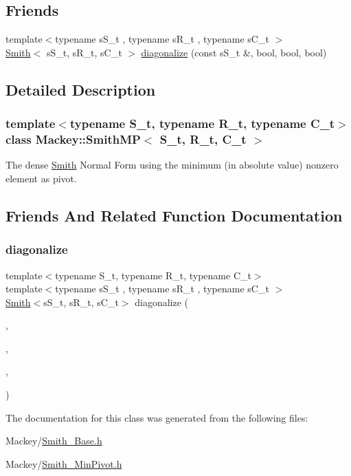 \subsection*{Friends}
\begin{DoxyCompactItemize}
\item 
{\footnotesize template$<$typename s\+S\+\_\+t , typename s\+R\+\_\+t , typename s\+C\+\_\+t $>$ }\\\hyperlink{classMackey_1_1Smith}{Smith}$<$ s\+S\+\_\+t, s\+R\+\_\+t, s\+C\+\_\+t $>$ \hyperlink{classMackey_1_1SmithMP_a020186c97759855bd063eeaaf0a17351}{diagonalize} (const s\+S\+\_\+t \&, bool, bool, bool)
\end{DoxyCompactItemize}


\subsection{Detailed Description}
\subsubsection*{template$<$typename S\+\_\+t, typename R\+\_\+t, typename C\+\_\+t$>$\newline
class Mackey\+::\+Smith\+M\+P$<$ S\+\_\+t, R\+\_\+t, C\+\_\+t $>$}

The dense \hyperlink{classMackey_1_1Smith}{Smith} Normal Form using the minimum (in absolute value) nonzero element as pivot. 

\subsection{Friends And Related Function Documentation}
\mbox{\label{classMackey_1_1SmithMP_a020186c97759855bd063eeaaf0a17351}} 
\subsubsection{\texorpdfstring{diagonalize}{diagonalize}}
{\footnotesize\ttfamily template$<$typename S\+\_\+t, typename R\+\_\+t, typename C\+\_\+t$>$ \\
template$<$typename s\+S\+\_\+t , typename s\+R\+\_\+t , typename s\+C\+\_\+t $>$ \\
\hyperlink{classMackey_1_1Smith}{Smith}$<$s\+S\+\_\+t, s\+R\+\_\+t, s\+C\+\_\+t$>$ diagonalize (\begin{DoxyParamCaption}\item[{const s\+S\+\_\+t \&}]{,  }\item[{bool}]{,  }\item[{bool}]{,  }\item[{bool}]{ }\end{DoxyParamCaption})\hspace{0.3cm}{\ttfamily [friend]}}



The documentation for this class was generated from the following files\+:\begin{DoxyCompactItemize}
\item 
Mackey/\hyperlink{Smith__Base_8h}{Smith\+\_\+\+Base.\+h}\item 
Mackey/\hyperlink{Smith__MinPivot_8h}{Smith\+\_\+\+Min\+Pivot.\+h}\end{DoxyCompactItemize}
